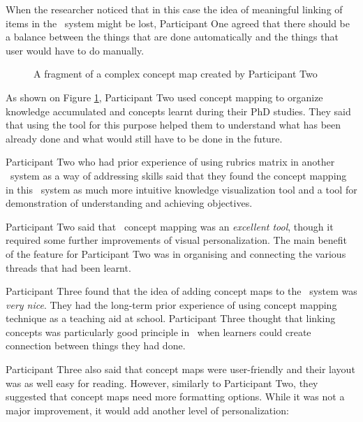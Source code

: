 When the researcher noticed that in this case the idea of meaningful linking of
items in the \ep~system might be lost, Participant One agreed that there should
be a balance between the things that are done automatically and the things that
user would have to do manually.

\begin{figure}[htb]
\centering
\setlength\fboxsep{0pt}
\setlength\fboxrule{0.5pt}
\caption{A fragment of a complex concept map created by Participant Two}
\label{fig:p2map}
\end{figure}

As shown on Figure \ref{fig:p2map}, Participant Two used concept mapping to
organize knowledge accumulated and concepts learnt during their PhD studies.
They said that using the tool for this purpose helped them to understand what
has been already done and what would still have to be done in the future.

Participant Two who had prior experience of using rubrics matrix in another
\ep~system as a way of addressing \LLLs skills said that they found the concept
mapping in this \ep~system as much more intuitive knowledge visualization tool
and a tool for demonstration of understanding and achieving objectives.

Participant Two said that \ep~concept mapping was an \textit{excellent tool},
though it required some further improvements of visual personalization. The main
benefit of the feature for Participant Two was in organising and connecting the
various threads that had been learnt. 


Participant Three found that the idea of adding concept maps to the \ep~system
was \textit{very nice}. They had the long-term prior experience of using concept
mapping technique as a teaching aid at school. Participant Three thought that
linking concepts was particularly good principle in \ep~when learners could
create connection between things they had done.

Participant Three also said that concept maps were user-friendly and their
layout was as well easy for reading. However, similarly to Participant Two, they
suggested that concept maps need more formatting options. While it was not a
major improvement, it would add another level of personalization:

